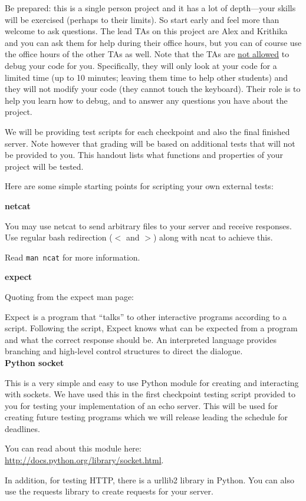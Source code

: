 
Be prepared: this is a single person project and it has a lot of depth---your
skills will be exercised (perhaps to their limits).  So start early and feel
more than welcome to ask questions. The lead TAs on this project are Alex and
Krithika and you can ask them for help during their office hours, but you can of
course use the office hours of the other TAs as well.   Note that the TAs are
\underline{not allowed} to debug your code for you. Specifically, they will only
look at your code for a limited time (up to 10 minutes; leaving them time to help
other students) and they will not modify your code (they cannot touch the keyboard).  Their role is 
to help you learn how to debug, and to answer any questions you have about the
project.


We will be providing test scripts for each checkpoint and also the final
finished server. Note however that grading will be based on additional tests that will not be provided to you.  This handout lists what functions and properties of your project will be tested.

Here are some simple starting points for scripting your own external tests:
\vspace{0.25in}

\noindent \textbf{netcat}

You may use netcat to send arbitrary files to your server and receive responses.
Use regular bash redirection ($<$ and $>$) along with ncat to achieve this.

Read \texttt{man ncat} for more information.

\noindent \textbf{expect}

Quoting from the expect man page:

Expect is a program that ``talks'' to other interactive programs according to a
script. Following the script, Expect knows what can be expected from a program
and what the correct response should be. An interpreted language provides
branching and high-level control structures to direct the dialogue.\\

\noindent \textbf{Python socket}

This is a very simple and easy to use Python module for creating and interacting
with sockets.  We have used this in the first checkpoint testing script
provided to you for testing your implementation of an echo server.  This will be
used for creating future testing programs which we will release leading the
schedule for deadlines.

You can read about this module here: \url{http://docs.python.org/library/socket.html}.

In addition, for testing HTTP, there is a urllib2 library in Python. You can also use the requests library to create requests for your server.


